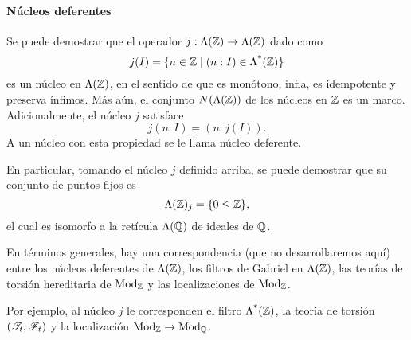 \paragraph{Núcleos deferentes}
Se puede demostrar que el operador $j:\Lambda(\mathbb Z)\to\Lambda(\mathbb Z)$
dado como
\[
    j(I) = \{n\in\mathbb Z\mid(n:I)\in\Lambda^{\text{*}}({\mathbb Z})\}
\]
es un núcleo en $\Lambda(\mathbb Z)$, en el sentido de que es monótono,
infla, es idempotente y preserva ínfimos.
Más aún, el conjunto $N(\Lambda(\mathbb Z))$ de los núcleos en $\mathbb Z$
es un marco.
Adicionalmente, el núcleo $j$ satisface
\[
    j(n:I) = (n:j(I))
.\]
A un núcleo con esta propiedad se le llama núcleo deferente.

En particular, tomando el núcleo $j$ definido arriba,
se puede demostrar que su conjunto de puntos fijos es
\[
    \Lambda(\mathbb Z)_j = \{0\leq \mathbb Z\}
,\]
el cual es isomorfo a la retícula $\Lambda(\mathbb Q)$ de ideales de $\mathbb Q$.

En términos generales, hay una correspondencia
(que no desarrollaremos aquí)
entre los núcleos deferentes de $\Lambda(\mathbb Z)$,
los filtros de Gabriel en $\Lambda(\mathbb Z)$,
las teorías de torsión hereditaria de $\mathrm{Mod}_\mathbb Z$
y las localizaciones de $\mathrm{Mod}_\mathbb Z$.

Por ejemplo, al núcleo $j$ le corresponden
el filtro $\Lambda^{\text{*}}({\mathbb Z})$, la teoría de torsión
$(\mathscr{T}_t,\mathscr{F}_t)$ y la localización
$\mathrm{Mod}_\mathbb Z\to\mathrm{Mod}_\mathbb Q$.

